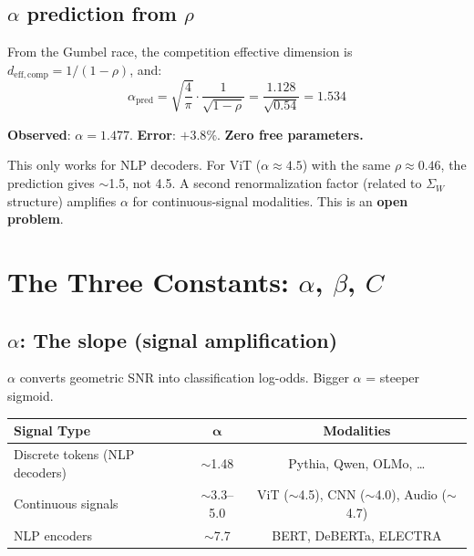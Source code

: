 \documentclass[11pt,a4paper]{article}
\begin{document}
\subsection{$\alpha$ prediction from $\rho$}

From the Gumbel race, the competition effective dimension is $d_\mathrm{eff,comp} = 1/(1-\rho)$, and:
\[
\alpha_\mathrm{pred} = \sqrt{\frac{4}{\pi}} \cdot \frac{1}{\sqrt{1-\rho}} = \frac{1.128}{\sqrt{0.54}} = 1.534
\]

\textbf{Observed}: $\alpha = 1.477$. \textbf{Error}: $+3.8\%$. \textbf{Zero free parameters.}

\begin{warnbox}[Caveat]
This only works for NLP decoders. For ViT ($\alpha \approx 4.5$) with the same $\rho \approx 0.46$, the prediction gives $\sim$1.5, not 4.5. A second renormalization factor (related to $\Sigma_W$ structure) amplifies $\alpha$ for continuous-signal modalities. This is an \textbf{open problem}.
\end{warnbox}

\section{The Three Constants: $\alpha$, $\beta$, $C$}

\subsection{$\alpha$: The slope (signal amplification)}

$\alpha$ converts geometric SNR into classification log-odds. Bigger $\alpha$ = steeper sigmoid.

\begin{center}
\begin{tabular}{lcc}
\toprule
\textbf{Signal Type} & $\boldsymbol{\alpha}$ & \textbf{Modalities} \\
\midrule
Discrete tokens (NLP decoders) & $\sim$1.48 & Pythia, Qwen, OLMo, \ldots \\
Continuous signals & $\sim$3.3--5.0 & ViT ($\sim$4.5), CNN ($\sim$4.0), Audio ($\sim$4.7) \\
NLP encoders & $\sim$7.7 & BERT, DeBERTa, ELECTRA \\
\bottomrule
\end{tabular}
\end{center}
\end{document}
